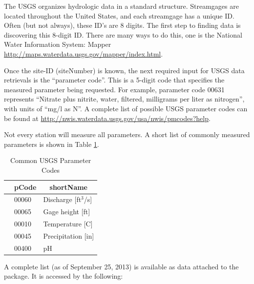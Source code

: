 \documentclass[a4paper,11pt]{article}\usepackage[]{graphicx}\usepackage[]{color}
\begin{document}
The USGS organizes hydrologic data in a standard structure.  Streamgages are located throughout the United States, and each streamgage has a unique ID.  Often (but not always), these ID's are 8 digits.  The first step to finding data is discovering this 8-digit ID. There are many ways to do this, one is the National Water Information System: Mapper \url{http://maps.waterdata.usgs.gov/mapper/index.html}.

Once the site-ID (siteNumber) is known, the next required input for USGS data retrievals is the \enquote{parameter code}.  This is a 5-digit code that specifies the measured parameter being requested.  For example, parameter code 00631 represents \enquote{Nitrate plus nitrite, water, filtered, milligrams per liter as nitrogen}, with units of \enquote{mg/l as N}. A complete list of possible USGS parameter codes can be found at \url{http://nwis.waterdata.usgs.gov/usa/nwis/pmcodes?help}.

Not every station will measure all parameters. A short list of commonly measured parameters is shown in Table \ref{tab:params}.


\begin{table}[ht]
\caption{Common USGS Parameter Codes} 
\label{tab:params}
{\footnotesize
\begin{tabular}{rll}
  \hline
 & \multicolumn{1}{c}{\textbf{\textsf{pCode}}} & \multicolumn{1}{c}{\textbf{\textsf{shortName}}} \\ 
  \hline
 & 00060 & Discharge [ft$^3$/s] \\ 
  [5pt] & 00065 & Gage height [ft] \\ 
  [5pt] & 00010 & Temperature [C] \\ 
  [5pt] & 00045 & Precipitation [in] \\ 
  [5pt] & 00400 & pH \\ 
   \hline
\end{tabular}
}
\end{table}


A complete list (as of September 25, 2013) is available as data attached to the package. It is accessed by the following:
\end{document}
